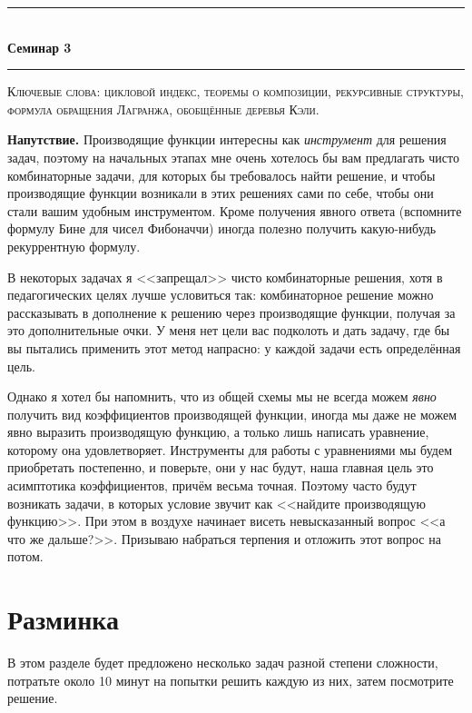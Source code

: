 \documentclass{article}
\def \topic {Семинар 3}
\theoremstyle{definition}
\begin{document}
\begin{center}

\newcommand{\HRule}{\rule{\linewidth}{0.5mm}}
\HRule \\[0.2cm]
{ \Large \bfseries \topic} %
\HRule

\end{center}

\textsc{Ключевые слова: цикловой индекс, теоремы о композиции, рекурсивные 
структуры, формула обращения Лагранжа, обобщённые деревья Кэли.}

\textbf{Напутствие.} Производящие функции интересны как \textit{инструмент} для 
решения задач, поэтому на начальных этапах мне очень хотелось бы вам предлагать 
чисто комбинаторные задачи, для которых бы требовалось найти решение, и чтобы 
производящие функции возникали в этих решениях сами по себе, чтобы они стали 
вашим удобным инструментом. Кроме получения явного ответа (вспомните формулу 
Бине для чисел Фибоначчи) иногда полезно получить какую-нибудь рекуррентную 
формулу.

В некоторых задачах я <<запрещал>> чисто комбинаторные решения, хотя в 
педагогических целях лучше условиться так: комбинаторное решение можно 
рассказывать в дополнение к решению через производящие функции, получая за это 
дополнительные очки. У меня нет цели вас подколоть и дать задачу, где бы вы 
пытались применить этот метод напрасно: у каждой задачи есть определённая цель.

Однако я хотел бы напомнить, что из общей схемы мы 
не всегда можем \textit{явно} получить вид коэффициентов производящей функции, 
иногда мы 
даже не можем явно выразить производящую функцию, а только лишь написать 
уравнение, которому она удовлетворяет. Инструменты для работы с уравнениями мы 
будем приобретать постепенно, и поверьте, они у нас будут, наша главная цель 
это асимптотика коэффициентов, причём весьма точная. Поэтому часто будут 
возникать задачи, в которых условие звучит как <<найдите производящую 
функцию>>. При этом в воздухе начинает висеть невысказанный вопрос <<а что же 
дальше?>>. Призываю набраться терпения и отложить этот вопрос на потом.

\section{Разминка}

В этом разделе будет предложено несколько задач разной степени сложности, 
потратьте около 10 минут на попытки решить каждую из них, затем посмотрите 
решение.
\end{document}
